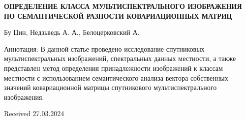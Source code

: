 \documentclass{article}
\begin{document}
\begin{multicols*}{2}
\vspace{+10pt}
\normalsize

\begin{center}
    \textbf{\fontsize{12pt}{16pt}\selectfont ОПРЕДЕЛЕНИЕ КЛАССА 
    МУЛЬТИСПЕКТРАЛЬНОГО
    ИЗОБРАЖЕНИЯ ПО
    СЕМАНТИЧЕСКОЙ РАЗНОСТИ
    КОВАРИАЦИОННЫХ МАТРИЦ}
\end{center}

\noindent\large Бу Цин, Недзьведь А. А., Белоцерковский А.
\vspace{0pt}


\par Аннотация: В данной статье проведено исследование 
спутниковых мультиспектральных изображений,
спектральных данных местности, а также представлен
метод определения принадлежности изображений к
классам местности с использованием семантического
анализа вектора собственных значений ковариационной 
матрицы спутникового мультиспектрального изображения.

\begin{flushright}
    Received 27.03.2024
\end{flushright}

\end{multicols*}
\end{document}
